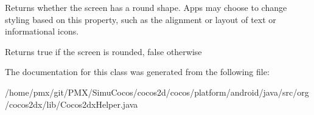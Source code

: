 Returns whether the screen has a round shape. Apps may choose to change styling based on this property, such as the alignment or layout of text or informational icons.

\begin{DoxyReturn}{Returns}
true if the screen is rounded, false otherwise 
\end{DoxyReturn}


The documentation for this class was generated from the following file\+:\begin{DoxyCompactItemize}
\item 
/home/pmx/git/\+P\+M\+X/\+Simu\+Cocos/cocos2d/cocos/platform/android/java/src/org/cocos2dx/lib/Cocos2dx\+Helper.\+java\end{DoxyCompactItemize}

